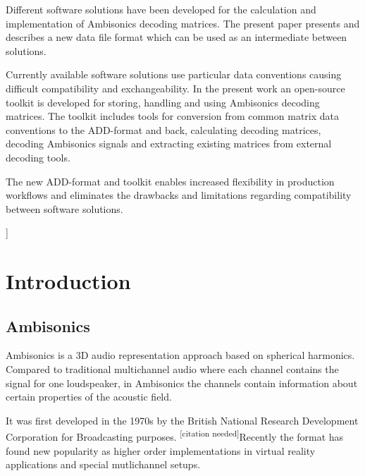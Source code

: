 \documentclass[a4paper, 10pt, twocolumn]{article}
\newcommand{\citationneeded}[1][]{\textsuperscript{\color{black} [citation needed]}}
\begin{document}
{\vspace{-3mm}}
\begin{onecolabstract}
{\vspace{3mm}}

Different software solutions have been developed for the calculation and implementation of Ambisonics decoding matrices. The present paper presents and describes a new data file format which can be used as an intermediate between solutions.

Currently available software solutions use particular data conventions causing difficult compatibility and exchangeability. In the present work an open-source toolkit is developed for storing, handling and using Ambisonics decoding matrices. The toolkit includes tools for conversion from common matrix data conventions to the ADD-format and back, calculating decoding matrices, decoding Ambisonics signals and extracting existing matrices from external decoding tools. 

The new ADD-format and toolkit enables increased flexibility in production workflows and eliminates the drawbacks and limitations regarding compatibility between software solutions.

\end{onecolabstract}
{\vspace{8mm}}]

\section{Introduction} \label{sec:introduction}

\subsection{Ambisonics}

Ambisonics is a 3D audio representation approach based on spherical harmonics. Compared to traditional multichannel audio where each channel contains the signal for one loudspeaker, in Ambisonics the channels contain information about certain properties of the acoustic field.

It was first developed in the 1970s by the British National Research Development Corporation for Broadcasting purposes.\citationneeded Recently the format has found new popularity as higher order implementations in virtual reality applications and special mutlichannel setups.



\end{document}
